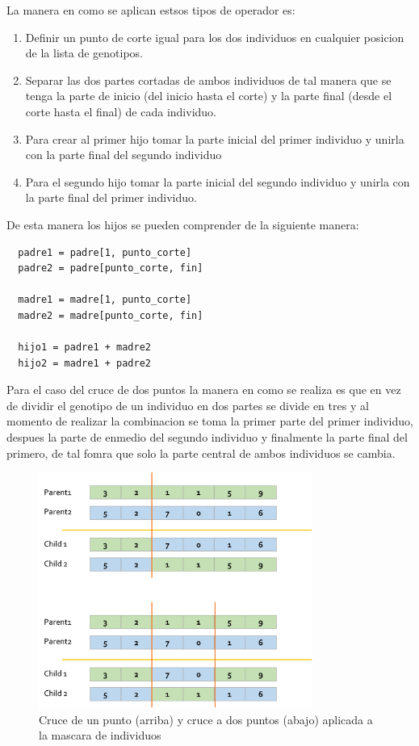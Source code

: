 La manera en como se aplican estsos tipos de operador es:
\begin{enumerate}
  \item Definir un punto de corte igual para los dos individuos en cualquier
  posicion de la lista de genotipos.
  \item Separar las dos partes cortadas de ambos individuos de tal manera que se
  tenga la parte de inicio (del inicio hasta el corte) y la parte final (desde
  el corte hasta el final) de cada individuo.
  \item Para crear al primer hijo tomar la parte inicial del primer individuo y
  unirla con la parte final del segundo individuo
  \item Para el segundo hijo tomar la parte inicial del segundo individuo y
  unirla con la parte final del primer individuo.
\end{enumerate}
De esta manera los hijos se pueden comprender de la siguiente manera:
\begin{verbatim}
  padre1 = padre[1, punto_corte]
  padre2 = padre[punto_corte, fin]

  madre1 = madre[1, punto_corte]
  madre2 = madre[punto_corte, fin]

  hijo1 = padre1 + madre2
  hijo2 = madre1 + padre2
\end{verbatim}
Para el caso del cruce de dos puntos la manera en como se realiza es que en vez
de dividir el genotipo de un individuo en dos partes se divide en tres y al
momento de realizar la combinacion se toma la primer parte del primer individuo,
despues la parte de enmedio del segundo individuo y finalmente la parte final
del primero, de tal fomra que solo la parte central de ambos individuos se
cambia.

\begin{figure}
  \centering
  \includegraphics[width=0.8\textwidth]{img/crossover.png}
  \caption{Cruce de un punto (arriba) y cruce a dos puntos (abajo) aplicada a la mascara de individuos}
  \label{figure:crossover}
\end{figure}

